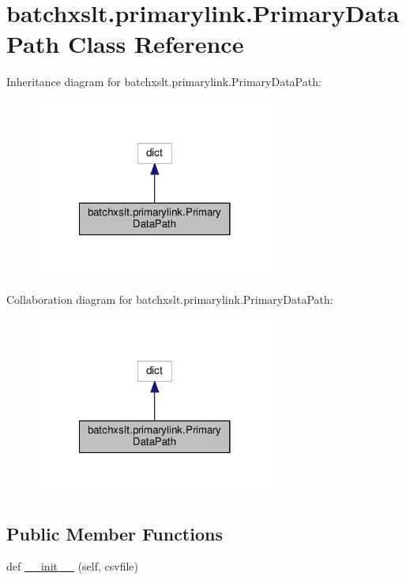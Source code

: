 \hypertarget{classbatchxslt_1_1primarylink_1_1_primary_data_path}{}\section{batchxslt.\+primarylink.\+Primary\+Data\+Path Class Reference}
\label{classbatchxslt_1_1primarylink_1_1_primary_data_path}


Inheritance diagram for batchxslt.\+primarylink.\+Primary\+Data\+Path\+:
\nopagebreak
\begin{figure}[H]
\begin{center}
\leavevmode
\includegraphics[width=222pt]{d9/dbc/classbatchxslt_1_1primarylink_1_1_primary_data_path__inherit__graph}
\end{center}
\end{figure}


Collaboration diagram for batchxslt.\+primarylink.\+Primary\+Data\+Path\+:
\nopagebreak
\begin{figure}[H]
\begin{center}
\leavevmode
\includegraphics[width=222pt]{de/dcd/classbatchxslt_1_1primarylink_1_1_primary_data_path__coll__graph}
\end{center}
\end{figure}
\subsection*{Public Member Functions}
\begin{DoxyCompactItemize}
\item 
def \hyperlink{classbatchxslt_1_1primarylink_1_1_primary_data_path_a06bc8d1c49fb2b4c2282a17f8a5e0ec6}{\+\_\+\+\_\+init\+\_\+\+\_\+} (self, csvfile)
\end{DoxyCompactItemize}


